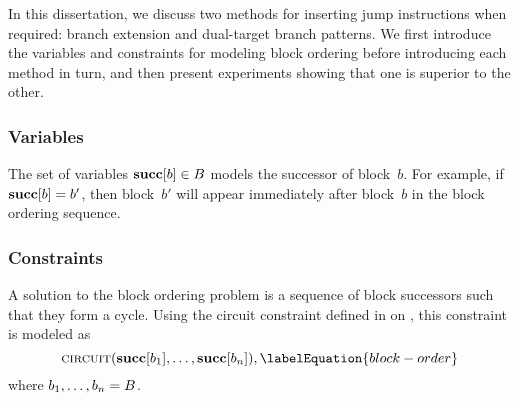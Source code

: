In this dissertation, we discuss two methods for inserting jump
\glspl{instruction} when required: \gls{branch extension} and \glspl{dual-target
  branch pattern}.
%
We first introduce the \glspl{variable} and \glspl{constraint} for modeling
\gls{block ordering} before introducing each method in turn, and then present
experiments showing that one is superior to the other.


\subsubsection{Variables}

The set of \glspl{variable} \mbox{$\mVar{succ}[b] \in \mBlockSet$} models the
successor of block~$b$\hspace{-.5pt}.
%
For example, if \mbox{$\mVar{succ}[b] = b'$}, then \gls{block}~$b'$ will appear
immediately after \gls{block}~$b$ in the \gls{block ordering} sequence.


\subsubsection{Constraints}

A \gls{solution} to the \gls{block ordering} problem is a sequence of
\gls{block} successors such that they form a \gls{cycle}.
%
Using the \gls{circuit constraint} defined in
 on , this
\gls{constraint} is modeled as
%
\begin{equation}
  \mCircuit(\mVar{succ}[b_1], \ldots, \mVar{succ}[b_n]),
  \labelEquation{block-order}
\end{equation}
%
where \mbox{$b_1, \ldots, b_n = B$}.


